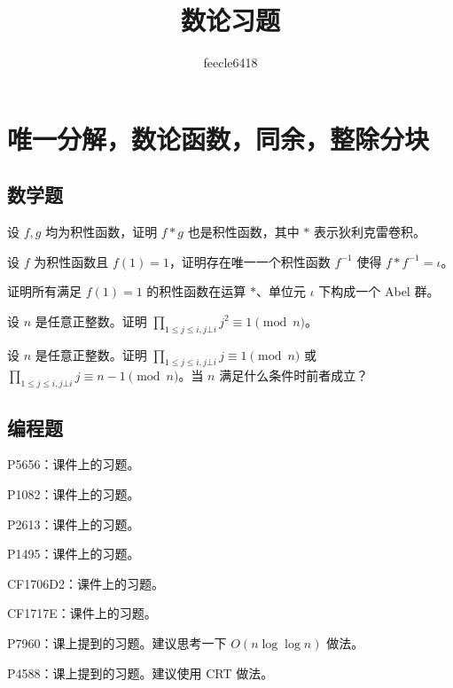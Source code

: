 \documentclass{noithesis}
\theoremstyle{definition}
\def\Z{\mathbb{Z}}
\def\R{\mathbb{R}}
\def\le{\leqslant}
\begin{document}
\def\R{\mathbb{R}}
\def\Z{\mathbb{Z}}

\def\d{\mathrm{d}}
\def\eps{\epsilon}
\title {数论习题}

\author {feecle6418}

\maketitle

\section{唯一分解，数论函数，同余，整除分块}

\subsection{数学题}

\begin{compactenum}
\item 设 $f,g$ 均为积性函数，证明 $f*g$ 也是积性函数，其中 $*$ 表示狄利克雷卷积。
\item 设 $f$ 为积性函数且 $f(1)=1$，证明存在唯一一个积性函数 $f^{-1}$ 使得 $f*f^{-1}=\iota$。
\item 证明所有满足 $f(1)=1$ 的积性函数在运算 $*$、单位元 $\iota$ 下构成一个 Abel 群。
\item 设 $n$ 是任意正整数。证明 $\prod_{1\le j\le i,j\bot i}j^2 \equiv 1\pmod n$。
\item 设 $n$ 是任意正整数。证明 $\prod_{1\le j\le i,j\bot i}j \equiv 1\pmod n$ 或 $\prod_{1\le j\le i,j\bot i}j \equiv n-1\pmod n$。当 $n$ 满足什么条件时前者成立？
\end{compactenum}

\subsection{编程题}

\begin{compactenum}
\item P5656：课件上的习题。
\item P1082：课件上的习题。
\item P2613：课件上的习题。
\item P1495：课件上的习题。
\item CF1706D2：课件上的习题。
\item CF1717E：课件上的习题。
\item P7960：课上提到的习题。建议思考一下 $O(n\log\log n)$ 做法。
\item P4588：课上提到的习题。建议使用 CRT 做法。
\end{compactenum}
\end{document}
